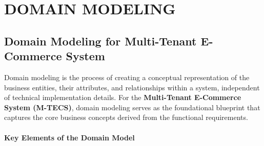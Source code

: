 \chapter{DOMAIN MODELING} \label{ch:procedure}

\section{Domain Modeling for Multi-Tenant E-Commerce System}

Domain modeling is the process of creating a conceptual representation of the business entities, their attributes, and relationships within a system, independent of technical implementation details. For the \textbf{Multi-Tenant E-Commerce System (M-TECS)}, domain modeling serves as the foundational blueprint that captures the core business concepts derived from the functional requirements.

\subsubsection*{Key Elements of the Domain Model}

